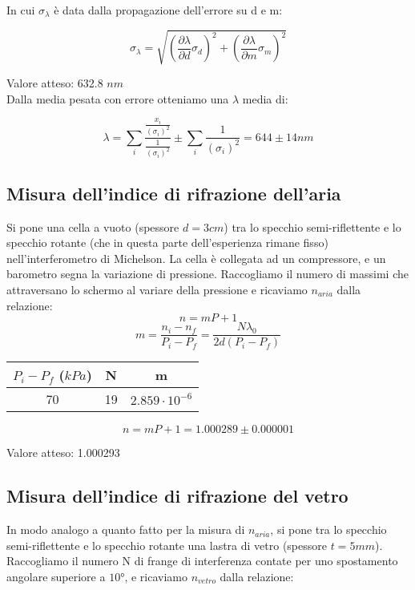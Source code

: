 In cui $\sigma_{\lambda}$ è data dalla propagazione dell'errore su d e m:

$$ \sigma_{\lambda} = \sqrt{ ( \frac{\partial \lambda}{\partial d} \sigma_{d} )^2 + ( \frac{\partial \lambda}{\partial m} \sigma_{m} )^2 } $$

Valore atteso: 632.8 $nm$\\

Dalla media pesata con errore otteniamo una $\lambda$ media di:

$$ \lambda =\displaystyle \sum_i{\frac{\frac{x_i}{(\sigma_i)^2}}{\frac{1}{(\sigma_i)^2}}} \pm \displaystyle\sum_i{\frac{1}{(\sigma_i)^2}} = 644 \pm 14 nm $$

\subsection{Misura dell'indice di rifrazione dell'aria}

Si pone una cella a vuoto (spessore $d=3 cm$) tra lo specchio semi-riflettente e lo specchio rotante (che in questa parte dell'esperienza rimane fisso) nell'interferometro di Michelson. La cella è collegata ad un compressore, e un barometro segna la variazione di pressione.
Raccogliamo il numero di massimi che attraversano lo schermo al variare della pressione e ricaviamo $n_{aria}$ dalla relazione:
$$ n = mP+1 $$
$$ m = \frac{n_i - n_f}{P_i-P_f} = \frac{N \lambda_0}{2d(P_i-P_f)}$$

\begin{center}
\begin{tabular}{c|c|c}
$P_i-P_f$ ($kPa$) & N & m \\
\midrule
70 & 19 & $2.859\cdot10^{-6}$\\
\end{tabular}
\end{center}

$$ n = mP+1 = 1.000289 \pm 0.000001$$

Valore atteso: 1.000293

\subsection{Misura dell'indice di rifrazione del vetro}

In modo analogo a quanto fatto per la misura di $n_{aria}$, si pone tra lo specchio semi-riflettente e lo specchio rotante una lastra di vetro (spessore $t= 5 mm$). Raccogliamo il numero N di frange di interferenza contate per uno spostamento angolare superiore a $10°$, e ricaviamo $n_{vetro}$ dalla relazione:

